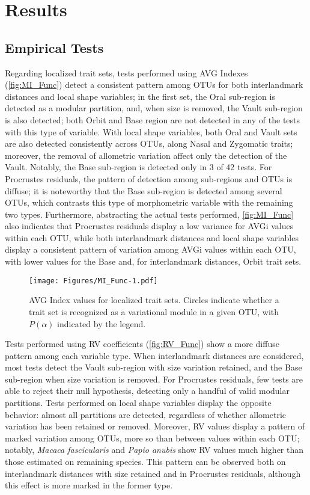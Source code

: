 \documentclass[11pt,twoside]{report}
\begin{document}
\section{Results}\label{results}

\subsection{Empirical Tests}\label{empirical-tests}

Regarding localized trait sets, tests performed using AVG Indexes
(\autoref{fig:MI_Func}) detect a consistent pattern among OTUs for both
interlandmark distances and local shape variables; in the first set, the
Oral sub-region is detected as a modular partition, and, when size is
removed, the Vault sub-region is also detected; both Orbit and Base
region are not detected in any of the tests with this type of variable.
With local shape variables, both Oral and Vault sets are also detected
consistently across OTUs, along Nasal and Zygomatic traits; moreover,
the removal of allometric variation affect only the detection of the
Vault. Notably, the Base sub-region is detected only in 3 of 42 tests.
For Procrustes residuals, the pattern of detection among sub-regions and
OTUs is diffuse; it is noteworthy that the Base sub-region is detected
among several OTUs, which contrasts this type of morphometric variable
with the remaining two types. Furthermore, abstracting the actual tests
performed, \autoref{fig:MI_Func} also indicates that Procrustes
residuals display a low variance for AVGi values within each OTU, while
both interlandmark distances and local shape variables display a
consistent pattern of variation among AVGi values within each OTU, with
lower values for the Base and, for interlandmark distances, Orbit trait
sets.

\begin{figure}[htbp]
\centering
\texttt{[image: Figures/MI\_Func-1.pdf]}
\caption{AVG Index values for localized trait sets. Circles indicate
whether a trait set is recognized as a variational module in a given
OTU, with $P(\alpha)$ indicated by the legend. \label{fig:MI_Func}}
\end{figure}

Tests performed using RV coefficients (\autoref{fig:RV_Func}) show a
more diffuse pattern among each variable type. When interlandmark
distances are considered, most tests detect the Vault sub-region with
size variation retained, and the Base sub-region when size variation is
removed. For Procrustes residuals, few tests are able to reject their
null hypothesis, detecting only a handful of valid modular partitions.
Tests performed on local shape variables display the opposite behavior:
almost all partitions are detected, regardless of whether allometric
variation has been retained or removed. Moreover, RV values display a
pattern of marked variation among OTUs, more so than between values
within each OTU; notably, \emph{Macaca fascicularis} and \emph{Papio
anubis} show RV values much higher than those estimated on remaining
species. This pattern can be observed both on interlandmark distances
with size retained and in Procrustes residuals, although this effect is
more marked in the former type.
\end{document}
